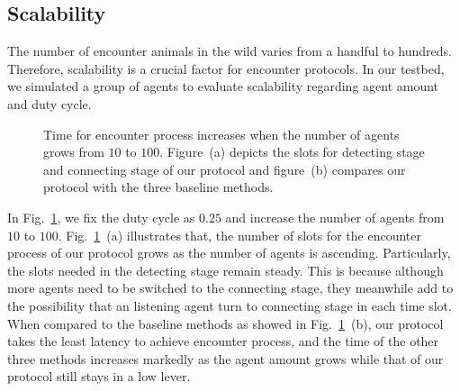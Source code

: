\subsection{Scalability}

The number of encounter animals in the wild varies from a handful to hundreds. 
Therefore, scalability is a crucial factor for encounter protocols. 
In our testbed, we simulated a group of agents to evaluate scalability 
regarding agent amount and duty cycle.

\begin{figure}[!h]
    \centering
    \hspace{0.01in}
    \caption{Time for encounter process increases when the number of agents grows from $10$ to $100$.
    Figure~(a) depicts the slots for detecting stage and connecting stage of our protocol and figure~(b)
    compares our protocol with the three baseline methods.}
    \label{fig_num}
\end{figure}


In Fig.~\ref{fig_num}, we fix the duty cycle as $0.25$ and 
increase the number of agents from $10$ to $100$.
Fig.~\ref{fig_num}~(a) illustrates that,
the number of slots for the encounter process 
of our protocol grows as the number of agents is ascending. Particularly,
the slots needed in the detecting stage remain steady.
This is because although more agents need to be switched to the connecting stage,
they meanwhile add to the possibility
that an listening agent turn to connecting stage in each time slot.
When compared to the baseline methods as showed in Fig.~\ref{fig_num}~(b), our protocol takes the least latency
to achieve encounter process, and the time of the other three methods increases
markedly as the agent amount grows while that of our protocol still stays in a low lever.

